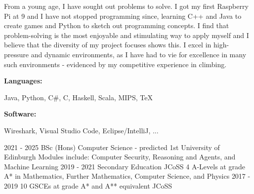 \documentclass[9pt]{developercv} %
\begin{document}
\begin{minipage}[t]{0.66\textwidth}
    From a young age, I have sought out problems to solve. 
	I got my first Raspberry Pi at 9 and I have not stopped programming since, learning C++ and Java to create games and Python to sketch out programming concepts. 
	I find that problem-solving is the most enjoyable and stimulating way to apply myself and I believe that the diversity of my project focuses shows this. 
    I excel in high-pressure and dynamic environments, as I have had to vie for excellence in many such environments - evidenced by my competitive experience in climbing.
\end{minipage}
\hfill %
\begin{minipage}[t]{0.265\textwidth}
    \vspace{-6pt}
    
    \begin{minipage}[t]{0.23\textwidth}
        \textbf{Languages:}
    \end{minipage}
    \hfill
    \begin{minipage}[t]{0.60\textwidth}
      Java, Python, C\#, C, Haskell, Scala, MIPS, TeX
    \end{minipage}
    \vspace{4mm}
    
    \begin{minipage}[t]{0.15\textwidth}
        \textbf{Software:}
    \end{minipage}
    \hfill
    \begin{minipage}[t]{0.68\textwidth}
      Wireshark, Visual Studio Code, Eclipse/IntelliJ, ...
    \end{minipage}
    
\end{minipage}


\vspace{-0 pt}
\begin{entrylist}
    \entry
		{2021 - 2025}
		{BSc (Hons) Computer Science - predicted 1st}
		{University of Edinburgh}
		{Modules include: Computer Security, Reasoning and Agents, and Machine Learning}
    \entry
		{2019 - 2021}
		{Secondary Education}
		{JCoSS}
		{4 A-Levels at grade A* in Mathematics, Further Mathematics, Computer Science, and Physics}
	\entry
		{2017 - 2019}
		{10 GSCEs at grade A* and A** equivalent}
		{JCoSS}
		{ }
\end{entrylist}
\end{document}
